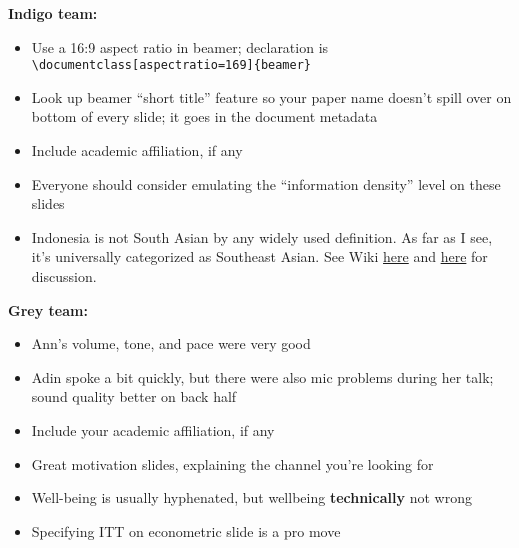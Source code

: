 \documentclass[12pt,pdftex,letterpaper]{article}
\begin{document}
\noindent \textbf{Indigo team:}
\begin{itemize}
	\item Use a 16:9 aspect ratio in beamer; declaration is \texttt{\textbackslash documentclass[aspectratio=169]\{beamer\}}
	
	\item Look up beamer ``short title'' feature so your paper name doesn't spill over on bottom of every slide; it goes in the document metadata
	
	\item Include academic affiliation, if any
	
	\item Everyone should consider emulating the ``information density'' level on these slides
	
	\item Indonesia is not South Asian by any widely used definition. As far as I see, it's universally categorized as Southeast Asian. See Wiki \href{https://en.wikipedia.org/wiki/South\_Asia#Ambiguity}{here} and \href{https://en.wikipedia.org/wiki/Southeast_Asia}{here} for discussion.
\end{itemize}

\vspace{0.5cm}

\noindent \textbf{Grey team:}
\begin{itemize}
	\item Ann's volume, tone, and pace were very good
	
	\item Adin spoke a bit quickly, but there were also mic problems during her talk; sound quality better on back half
	
	\item Include your academic affiliation, if any
	
	\item Great motivation slides, explaining the channel you're looking for
	
	\item Well-being is usually hyphenated, but wellbeing \textbf{technically} not wrong
	
	\item Specifying ITT on econometric slide is a pro move
\end{itemize}

\vspace{0.5cm}
\end{document}
